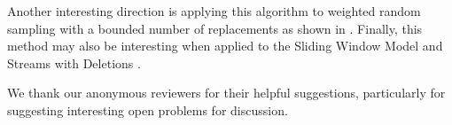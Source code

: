 \documentclass{llncs}
\begin{document}
Another interesting direction is applying this algorithm to weighted random sampling with a bounded number of replacements as shown in \cite{efraimidis2010weighted}. Finally, this method may also be interesting when applied to the Sliding Window Model \cite{our} and Streams with Deletions \cite{dynamic}.

We thank our anonymous reviewers for their helpful suggestions, particularly for suggesting interesting open problems for discussion.


\newpage


\end{document}
